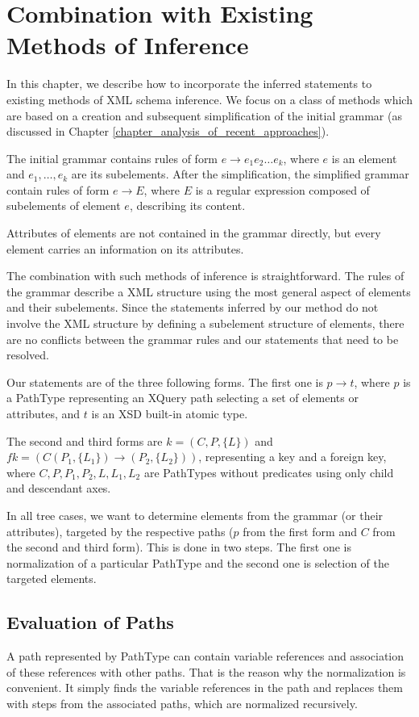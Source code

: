 \chapter{Combination with Existing Methods of Inference} \label{CHAPTER_combination_with_existings_methods_of_inference}
In this chapter, we describe how to incorporate the inferred statements to existing methods of XML schema inference. We focus on a class of methods which are based on a creation and subsequent simplification of the initial grammar (as discussed in Chapter \ref{chapter_analysis_of_recent_approaches}).

The initial grammar contains rules of form $e \rightarrow e_1e_2\dots e_k$, where $e$ is an element and $e_1, \dots , e_k$ are its subelements. After the simplification, the simplified grammar contain rules of form $e \rightarrow E$, where $E$ is a regular expression composed of subelements of element $e$, describing its content.

Attributes of elements are not contained in the grammar directly, but every element carries an information on its attributes.

The combination with such methods of inference is straightforward. The rules of the grammar describe a XML structure using the most general aspect of elements and their subelements. Since the statements inferred by our method do not involve the XML structure by defining a subelement structure of elements, there are no conflicts between the grammar rules and our statements that need to be resolved.

Our statements are of the three following forms. The first one is $p \rightarrow t$, where $p$ is a PathType representing an XQuery path selecting a set of elements or attributes, and $t$ is an XSD built-in atomic type.

The second and third forms are $k = (C,P,\{L\})$ and $fk = (C(P_1,\{L_1\}) \rightarrow (P_2,\{L_2\}))$, representing a key and a foreign key, where $C,P,P_1,P_2,L,L_1,L_2$ are PathTypes without predicates using only child and descendant axes.

In all tree cases, we want to determine elements from the grammar (or their attributes), targeted by the respective paths ($p$ from the first form and $C$ from the second and third form). This is done in two steps. The first one is normalization of a particular PathType and the second one is selection of the targeted elements.

\section{Evaluation of Paths}
A path represented by PathType can contain variable references and association of these references with other paths. That is the reason why the normalization is convenient. It simply finds the variable references in the path and replaces them with steps from the associated paths, which are normalized recursively.

